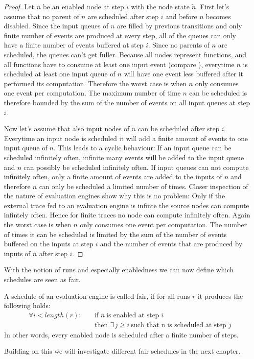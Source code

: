 \begin{proof}
  Let \(n\) be an enabled node at step \(i\) with the node state \(\widetilde{n}\).
  First let's assume that no parent of \(n\) are scheduled after step \(i\) and before \(n\) becomes disabled.
  Since the input queues of \(n\) are filled by previous transitions and only finite number of events are produced at every step, all of the queues can only have a finite number of events buffered at step \(i\).
  Since no parents of \(n\) are scheduled, the queues can't get fuller.
  Because all nodes represent functions, and all functions have to consume at least one input event (compare ), everytime \(n\) is scheduled at least one input queue of \(n\) will have one event less buffered after it performed its computation.
  Therefore the worst case is when \(n\) only consumes one event per computation.
  The maximum number of time \(n\) can be scheduled is therefore bounded by the sum of the number of events on all input queues at step \(i\).

  Now let's assume that also input nodes of \(n\) can be scheduled after step \(i\).
  Everytime an input node is scheduled it will add a finite amount of events to one input queue of \(n\).
  This leads to a cyclic behaviour: If an input queue can be scheduled infinitely often, infinite many events will be added to the input queue and \(n\) can possibly be scheduled infinitely often.
  If input queues can not compute infinitely often, only a finite amount of events are added to the inputs of \(n\) and therefore \(n\) can only be scheduled a limited number of times.
  Closer inspection of the nature of evaluation engines show why this is no problem: Only if the external trace fed to an evaluation engine is infinte the source nodes can compute infintely often.
  Hence for finite traces no node can compute infinitely often.
  Again the worst case is when \(n\) only consumes one event per computation.
  The number of times it can be scheduled is limited by the sum of the number of events buffered on the inputs at step \(i\) and the number of events that are produced by inputs of \(n\) after step \(i\).
\end{proof}

With the notion of runs and especially enabledness we can now define which schedules are seen as fair.

\begin{definition}[name = Fair Schedules]\label{def:fair_schedule}
  A schedule of an evaluation engine is called fair, if for all runs \(r\)  it produces the following holds:
  \begin{align*}
    &\forall i < \mathit{length}(r):\ &&\text{if }n\ \text{is enabled at step } i\\
    &                                 &&\text{then } \exists\, j \geq i\ \text{such that n is scheduled at step } j
\end{align*}
In other words, every enabled node is scheduled after a finite number of steps.
\end{definition}

Building on this we will investigate different fair schedules in the next chapter.
